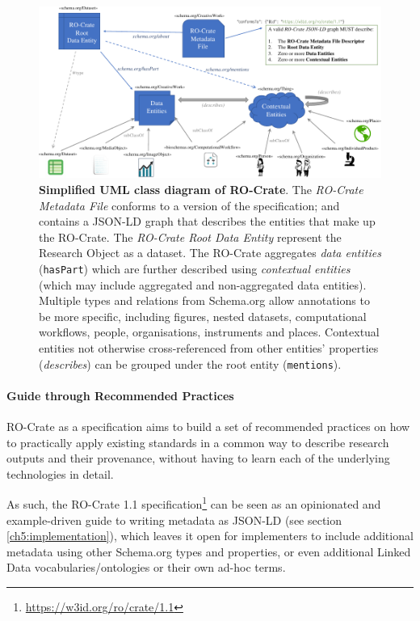 \begin{figure}
\includegraphics[width=\textwidth]{figures/ch05/ro-crate-uml.pdf}
	\caption[Simplified UML class diagram of RO-Crate]{\textbf{Simplified UML class diagram of RO-Crate}. The 
\emph{RO-Crate Metadata File} conforms to a version of the specification;
and contains a JSON-LD graph \cite{w3-ldp} that describes the
entities that make up the RO-Crate. The \emph{RO-Crate Root Data
Entity} represent the Research Object as a dataset. The RO-Crate
aggregates \emph{data entities} (\texttt{hasPart}) which are further
described using \emph{contextual entities} (which may include
aggregated and non-aggregated data entities). Multiple types and
relations from Schema.org allow annotations to be more specific,
including figures, nested datasets, computational workflows, people,
organisations, instruments and places. Contextual entities not
otherwise cross-referenced from other entities' properties 
(\emph{describes}) can be grouped under the root entity (\texttt{mentions}).}
\label{ch5:fig:uml}
\end{figure}

\paragraph{Guide through Recommended
Practices}\label{ch5:recommendedpractices}

RO-Crate as a specification aims to build a set of recommended practices
on how to practically apply existing standards in a common way to
describe research outputs and their provenance, without having to learn
each of the underlying technologies in detail.

As such, the RO-Crate 1.1
specification\footnote{\url{https://w3id.org/ro/crate/1.1}} \cite{rocrate1.1}
can be seen as an opinionated and example-driven guide to writing
\cite{Guha 2015} metadata as
JSON-LD \cite{w3-ldp} (see
section \vref{ch5:implementation}), which
leaves it open for implementers to include additional metadata using
other Schema.org types and properties, or even additional Linked Data
vocabularies/ontologies or their own ad-hoc terms.

